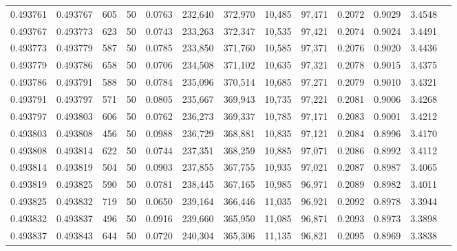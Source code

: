 \begin{tabular}{rrrrrrrrrrrrr}
0.493761 & 0.493767 &   605 &  50 &                                     0.0763 & 232,640 & 372,970 &  10,485 &  97,471 & 0.2072 & 0.9029 & 3.4548 \\
0.493767 & 0.493773 &   623 &  50 &                                     0.0743 & 233,263 & 372,347 &  10,535 &  97,421 & 0.2074 & 0.9024 & 3.4491 \\
0.493773 & 0.493779 &   587 &  50 &                                     0.0785 & 233,850 & 371,760 &  10,585 &  97,371 & 0.2076 & 0.9020 & 3.4436 \\
0.493779 & 0.493786 &   658 &  50 &                                     0.0706 & 234,508 & 371,102 &  10,635 &  97,321 & 0.2078 & 0.9015 & 3.4375 \\
0.493786 & 0.493791 &   588 &  50 &                                     0.0784 & 235,096 & 370,514 &  10,685 &  97,271 & 0.2079 & 0.9010 & 3.4321 \\
0.493791 & 0.493797 &   571 &  50 &                                     0.0805 & 235,667 & 369,943 &  10,735 &  97,221 & 0.2081 & 0.9006 & 3.4268 \\
0.493797 & 0.493803 &   606 &  50 &                                     0.0762 & 236,273 & 369,337 &  10,785 &  97,171 & 0.2083 & 0.9001 & 3.4212 \\
0.493803 & 0.493808 &   456 &  50 &                                     0.0988 & 236,729 & 368,881 &  10,835 &  97,121 & 0.2084 & 0.8996 & 3.4170 \\
0.493808 & 0.493814 &   622 &  50 &                                     0.0744 & 237,351 & 368,259 &  10,885 &  97,071 & 0.2086 & 0.8992 & 3.4112 \\
0.493814 & 0.493819 &   504 &  50 &                                     0.0903 & 237,855 & 367,755 &  10,935 &  97,021 & 0.2087 & 0.8987 & 3.4065 \\
0.493819 & 0.493825 &   590 &  50 &                                     0.0781 & 238,445 & 367,165 &  10,985 &  96,971 & 0.2089 & 0.8982 & 3.4011 \\
0.493825 & 0.493832 &   719 &  50 &                                     0.0650 & 239,164 & 366,446 &  11,035 &  96,921 & 0.2092 & 0.8978 & 3.3944 \\
0.493832 & 0.493837 &   496 &  50 &                                     0.0916 & 239,660 & 365,950 &  11,085 &  96,871 & 0.2093 & 0.8973 & 3.3898 \\
0.493837 & 0.493843 &   644 &  50 &                                     0.0720 & 240,304 & 365,306 &  11,135 &  96,821 & 0.2095 & 0.8969 & 3.3838 \\

\end{tabular}
